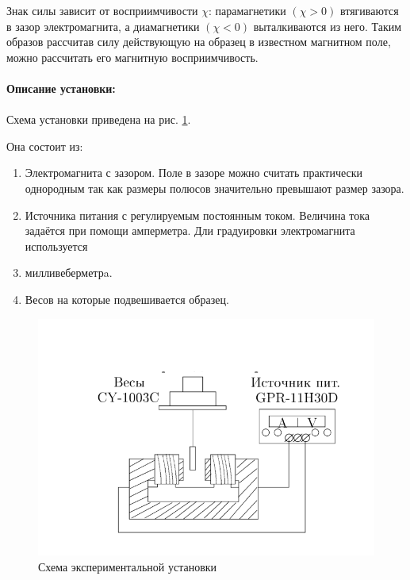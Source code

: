 \documentclass[a4paper,12pt]{article}
\begin{document}
Знак силы зависит от восприимчивости $\chi$: парамагнетики $(\chi > 0)$ втягиваются в зазор электромагнита, а диамагнетики $(\chi < 0)$ выталкиваются из него. Таким образов рассчитав силу действующую на образец в известном магнитном поле, можно рассчитать его магнитную восприимчивость.


\paragraph{Описание установки:}
\paragraph{}
Схема установки приведена на рис. \ref{fig:setup}.

 Она состоит из:
\begin{enumerate}
\itemsep0em
\item Электромагнита с зазором. Поле в зазоре можно считать практически однородным
так как размеры полюсов значительно превышают размер зазора. 
\item Источника питания с регулируемым постоянным током. Величина тока задаётся при
помощи амперметра. Дли градуировки электромагнита используется \item милливеберметрa.
\item Весов на которые подвешивается образец.
\end{enumerate}
\begin{figure}
\begin{center}
\includegraphics[width=0.5\linewidth]{setup.png}
\caption{Схема экспериментальной установки}
\label{fig:setup}
\end{center}
\end{figure}
\end{document}
